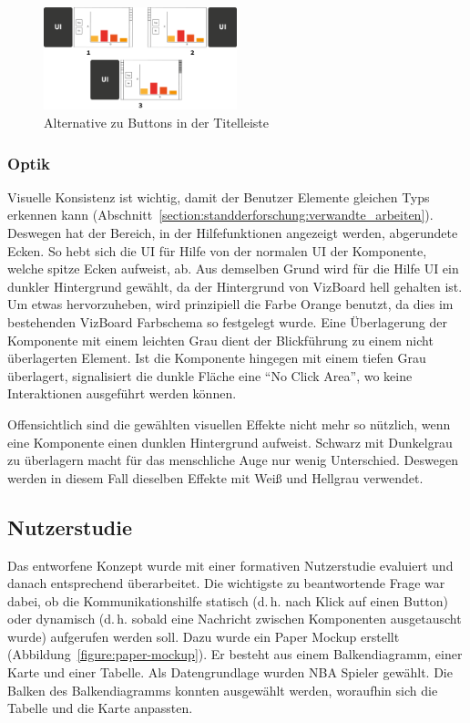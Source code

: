 \documentclass[
	headsepline,
	footsepline,
	fontsize=12pt,
	bibliography=totoc
]{scrbook}
\begin{document}
\begin{figure}[htbp]
   \centering
   \includegraphics[width=0.5\textwidth]{images/konzeption-ui-buttonleiste.png}
   \caption{Alternative zu Buttons in der Titelleiste}
   \label{figure:ui-buttonleiste}
\end{figure}

\subsubsection{Optik}

Visuelle Konsistenz ist wichtig, damit der Benutzer Elemente gleichen Typs erkennen kann (Abschnitt~\ref{section:standderforschung:verwandte_arbeiten}). Deswegen hat der Bereich, in der Hilfefunktionen angezeigt werden, abgerundete Ecken. So hebt sich die UI für Hilfe von der normalen UI der Komponente, welche spitze Ecken aufweist, ab. Aus demselben Grund wird für die Hilfe UI ein dunkler Hintergrund gewählt, da der Hintergrund von VizBoard hell gehalten ist. Um etwas hervorzuheben, wird prinzipiell die Farbe Orange benutzt, da dies im bestehenden VizBoard Farbschema so festgelegt wurde. Eine Überlagerung der Komponente mit einem leichten Grau dient der Blickführung zu einem nicht überlagerten Element. Ist die Komponente hingegen mit einem tiefen Grau überlagert, signalisiert die dunkle Fläche eine \enquote{No Click Area}, wo keine Interaktionen ausgeführt werden können. 

Offensichtlich sind die gewählten visuellen Effekte nicht mehr so nützlich, wenn eine Komponente einen dunklen Hintergrund aufweist. Schwarz mit Dunkelgrau zu überlagern macht für das menschliche Auge nur wenig Unterschied. Deswegen werden in diesem Fall dieselben Effekte mit Weiß und Hellgrau verwendet.

\subsection{Nutzerstudie}
\label{section:konzeption:einleitung:nutzerstudie}

Das entworfene Konzept wurde mit einer formativen Nutzerstudie evaluiert und danach entsprechend überarbeitet. Die wichtigste zu beantwortende Frage war dabei, ob die Kommunikationshilfe statisch (d.\,h. nach Klick auf einen Button) oder dynamisch (d.\,h. sobald eine Nachricht zwischen Komponenten ausgetauscht wurde) aufgerufen werden soll. Dazu wurde ein Paper Mockup \cite{Virzi1996} erstellt (Abbildung~\ref{figure:paper-mockup}). Er besteht aus einem Balkendiagramm, einer Karte und einer Tabelle. Als Datengrundlage wurden NBA Spieler gewählt. Die Balken des Balkendiagramms konnten ausgewählt werden, woraufhin sich die Tabelle und die Karte anpassten.
\end{document}
